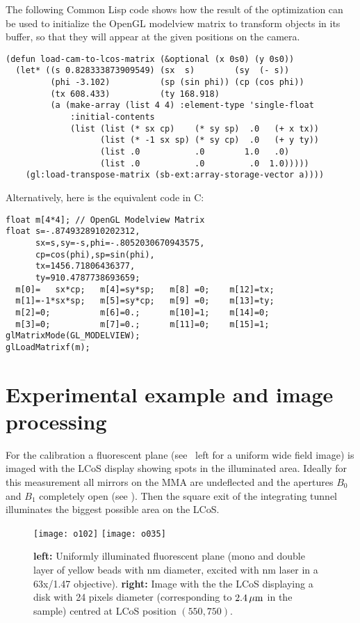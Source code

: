 The following Common Lisp code shows how the result of the
optimization can be used to initialize the OpenGL modelview matrix to
transform objects in its buffer, so that they will appear at the given
positions on the camera.

{\small
\begin{verbatim}
(defun load-cam-to-lcos-matrix (&optional (x 0s0) (y 0s0))
  (let* ((s 0.828333873909549) (sx  s)        (sy  (- s))
         (phi -3.102)          (sp (sin phi)) (cp (cos phi))
         (tx 608.433)          (ty 168.918)
         (a (make-array (list 4 4) :element-type 'single-float
             :initial-contents
             (list (list (* sx cp)    (* sy sp)  .0   (+ x tx))
                   (list (* -1 sx sp) (* sy cp)  .0   (+ y ty))
                   (list .0           .0        1.0   .0)
                   (list .0           .0         .0  1.0)))))
    (gl:load-transpose-matrix (sb-ext:array-storage-vector a))))    
\end{verbatim}
}
  

\noindent
Alternatively, here is the equivalent code in C:

{\small
\begin{verbatim}
float m[4*4]; // OpenGL Modelview Matrix
float s=-.8749328910202312,
      sx=s,sy=-s,phi=-.8052030670943575,
      cp=cos(phi),sp=sin(phi),
      tx=1456.71806436377,
      ty=910.4787738693659;
  m[0]=   sx*cp;   m[4]=sy*sp;   m[8] =0;    m[12]=tx; 
  m[1]=-1*sx*sp;   m[5]=sy*cp;   m[9] =0;    m[13]=ty; 
  m[2]=0;          m[6]=0.;      m[10]=1;    m[14]=0;  
  m[3]=0;          m[7]=0.;      m[11]=0;    m[15]=1;  
glMatrixMode(GL_MODELVIEW);
glLoadMatrixf(m);
\end{verbatim}
}
\section{Experimental example and image processing}

For the calibration a fluorescent plane (see
~left for a uniform wide field image) is imaged
with the LCoS display showing spots in the illuminated area.  Ideally
for this measurement all mirrors on the MMA are undeflected and the
apertures $B_0$ and $B_1$ completely open (see
). Then the square exit of the integrating
tunnel illuminates the biggest possible area on the LCoS.

\begin{figure}[!hbt]
  \centering
  \texttt{[image: o102]}
  \texttt{[image: o035]}
  \caption{{\bf left:} Uniformly illuminated fluorescent plane (mono
    and double layer of yellow beads with \unit[110]{nm} diameter,
    excited with \unit[473]{nm} laser in a 63x/1.47 objective). {\bf
      right:} Image with the the LCoS displaying a disk with 24 pixels
    diameter (corresponding to $\unit[2.4]{\mu m}$ in the sample)
    centred at LCoS position $(550,750)$.}
  \label{fig:rigid-pics}
\end{figure}

